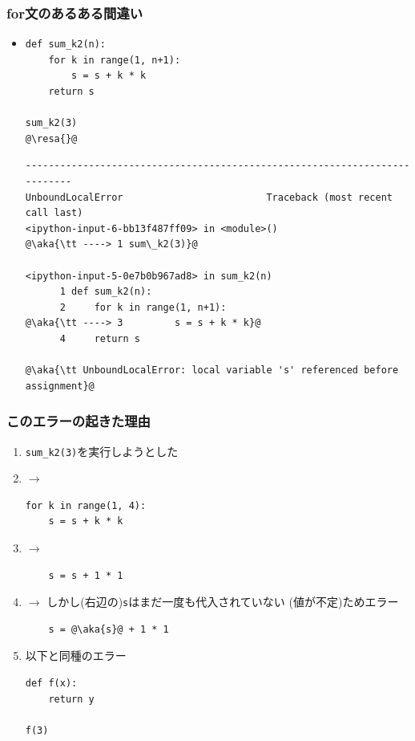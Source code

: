 \documentclass[10pt,dvipdfmx]{beamer}
\newcommand{\ore}[1]{{\color{orange}#1}}
\newcommand{\aka}[1]{{\color{red}#1}}
\newcommand{\resa}[1]{\ore{\textsl{$\rightarrow$ #1}}}
\begin{document}
\begin{frame}[fragile]
\frametitle{for文のあるある間違い}
\begin{itemize}
\item []
\begin{lstlisting}
def sum_k2(n):
    for k in range(1, n+1):
        s = s + k * k
    return s

sum_k2(3)
@\resa{}@
\end{lstlisting}
\begin{lstlisting}[basicstyle=\ttfamily\tiny]
---------------------------------------------------------------------------
UnboundLocalError                         Traceback (most recent call last)
<ipython-input-6-bb13f487ff09> in <module>()
@\aka{\tt ----> 1 sum\_k2(3)}@

<ipython-input-5-0e7b0b967ad8> in sum_k2(n)
      1 def sum_k2(n):
      2     for k in range(1, n+1):
@\aka{\tt ----> 3         s = s + k * k}@
      4     return s

@\aka{\tt UnboundLocalError: local variable 's' referenced before assignment}@
\end{lstlisting}
\end{itemize}
\end{frame}

\begin{frame}[fragile]
  \frametitle{このエラーの起きた理由}
  \begin{enumerate}
  \item {\tt sum\_k2(3)}を実行しようとした
  \item $\rightarrow$
\begin{lstlisting}
for k in range(1, 4):
    s = s + k * k
\end{lstlisting}
\item $\rightarrow$
\begin{lstlisting}
    s = s + 1 * 1
\end{lstlisting}
\item $\rightarrow$ しかし(右辺の){\tt s}はまだ一度も代入されていない
  (値が不定)ためエラー
\begin{lstlisting}
    s = @\aka{s}@ + 1 * 1
\end{lstlisting}
\item 以下と同種のエラー
\begin{lstlisting}
def f(x):
    return y

f(3)
\end{lstlisting}
\end{enumerate}
\end{frame}
\end{document}
